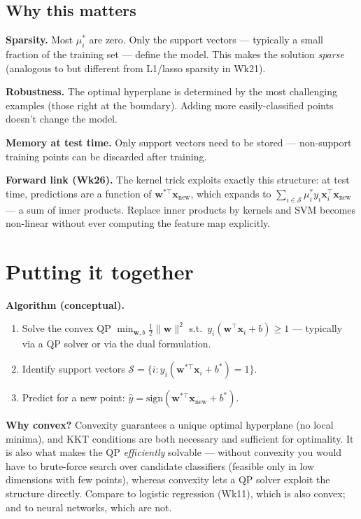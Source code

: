 \documentclass[11pt, a4paper]{article}
\begin{document}
\subsection{Why this matters}

\textbf{Sparsity.} Most $\mu_i^*$ are zero. Only the support vectors — typically a small fraction of the training set — define the model. This makes the solution \emph{sparse} (analogous to but different from L1/lasso sparsity in Wk21).

\textbf{Robustness.} The optimal hyperplane is determined by the most challenging examples (those right at the boundary). Adding more easily-classified points doesn't change the model.

\textbf{Memory at test time.} Only support vectors need to be stored — non-support training points can be discarded after training.

\textbf{Forward link (Wk26).} The kernel trick exploits exactly this structure: at test time, predictions are a function of $\mathbf{w}^{*\top}\mathbf{x}_{\text{new}}$, which expands to $\sum_{i\in\mathcal{S}}\mu_i^* y_i \mathbf{x}_i^\top\mathbf{x}_{\text{new}}$ — a sum of inner products. Replace inner products by kernels and SVM becomes non-linear without ever computing the feature map explicitly.

\section{Putting it together}

\textbf{Algorithm (conceptual).}
\begin{enumerate}
  \item Solve the convex QP $\min_{\mathbf{w},b}\tfrac{1}{2}\|\mathbf{w}\|^2$ s.t.\ $y_i(\mathbf{w}^\top\mathbf{x}_i + b) \ge 1$ — typically via a QP solver or via the dual formulation.
  \item Identify support vectors $\mathcal{S} = \{i : y_i(\mathbf{w}^{*\top}\mathbf{x}_i + b^*) = 1\}$.
  \item Predict for a new point: $\hat y = \text{sign}(\mathbf{w}^{*\top}\mathbf{x}_{\text{new}} + b^*)$.
\end{enumerate}

\textbf{Why convex?} Convexity guarantees a unique optimal hyperplane (no local minima), and KKT conditions are both necessary and sufficient for optimality. It is also what makes the QP \emph{efficiently} solvable — without convexity you would have to brute-force search over candidate classifiers (feasible only in low dimensions with few points), whereas convexity lets a QP solver exploit the structure directly. Compare to logistic regression (Wk11), which is also convex; and to neural networks, which are not.
\end{document}
